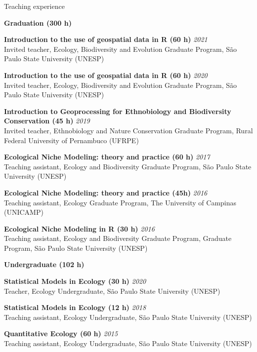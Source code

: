 \documentclass{resume}
\begin{document}

\begin{rSection}{Teaching experience}

{\bf Graduation (300 h)}

{\bf Introduction to the use of geospatial data in R (60 h)} \hfill{\em 2021} \\ 
Invited teacher, Ecology, Biodiversity and Evolution Graduate Program, São Paulo State University (UNESP)

{\bf Introduction to the use of geospatial data in R (60 h)} \hfill{\em 2020} \\ 
Invited teacher, Ecology, Biodiversity and Evolution Graduate Program, São Paulo State University (UNESP)

{\bf Introduction to Geoprocessing for Ethnobiology and Biodiversity Conservation (45 h)} \hfill{\em 2019} \\ 
Invited teacher, Ethnobiology and Nature Conservation Graduate Program, Rural Federal University of Pernambuco (UFRPE)

{\bf Ecological Niche Modeling: theory and practice (60 h)} \hfill{\em 2017} \\ 
Teaching assistant, Ecology and Biodiversity Graduate Program, São Paulo State University (UNESP)

{\bf Ecological Niche Modeling: theory and practice (45h)} \hfill{\em 2016} \\ 
Teaching assistant, Ecology Graduate Program, The University of Campinas (UNICAMP)

{\bf Ecological Niche Modeling in R (30 h)} \hfill{\em 2016} \\ 
Teaching assistant, Ecology and Biodiversity Graduate Program, Graduate Program, São Paulo State University (UNESP)

{\bf Undergraduate (102 h)}

{\bf Statistical Models in Ecology (30 h)} \hfill{\em 2020} \\ 
Teacher, Ecology Undergraduate, São Paulo State University (UNESP)

{\bf Statistical Models in Ecology (12 h)} \hfill{\em 2018} \\ 
Teaching assistant, Ecology Undergraduate, São Paulo State University (UNESP)

{\bf Quantitative Ecology (60 h)} \hfill{\em 2015} \\ 
Teaching assistant, Ecology Undergraduate, São Paulo State University (UNESP)

\end{rSection}
\end{document}
